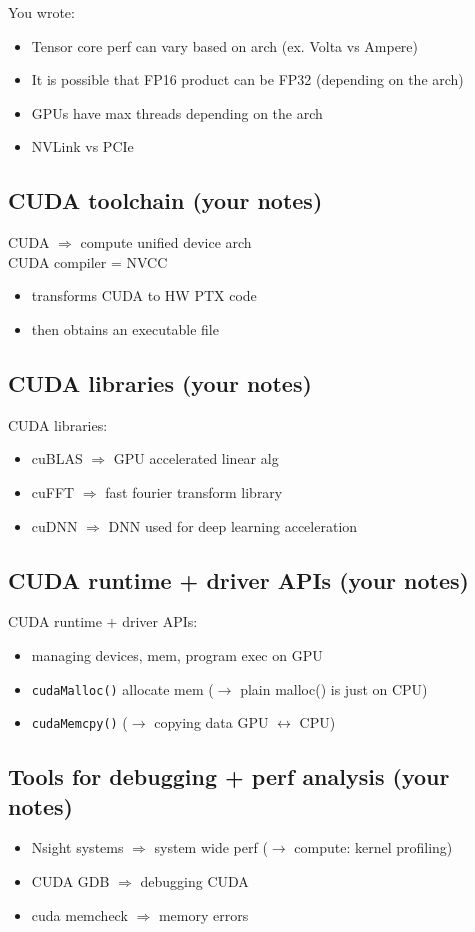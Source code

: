 \documentclass[11pt]{article}
\newcommand{\blue}[1]{\textcolor{myblue}{#1}}
\begin{document}
You wrote:
\begin{itemize}
\item Tensor core perf can vary based on arch (ex. Volta vs Ampere)
\item It is possible that FP16 product can be FP32 (depending on the arch)
\item GPUs have max threads depending on the arch
\item NVLink vs PCIe
\end{itemize}

\subsection*{\blue{CUDA toolchain (your notes)}}
CUDA $\Rightarrow$ compute unified device arch\\
CUDA compiler = NVCC
\begin{itemize}
\item transforms CUDA to HW PTX code
\item then obtains an executable file
\end{itemize}

\subsection*{\blue{CUDA libraries (your notes)}}
CUDA libraries:
\begin{itemize}
\item cuBLAS $\Rightarrow$ GPU accelerated linear alg
\item cuFFT $\Rightarrow$ fast fourier transform library
\item cuDNN $\Rightarrow$ DNN used for deep learning acceleration
\end{itemize}

\subsection*{\blue{CUDA runtime + driver APIs (your notes)}}
CUDA runtime + driver APIs:
\begin{itemize}
\item managing devices, mem, program exec on GPU
\item \texttt{cudaMalloc()} allocate mem \quad ($\rightarrow$ plain malloc() is just on CPU)
\item \texttt{cudaMemcpy()} \quad ($\rightarrow$ copying data GPU $\leftrightarrow$ CPU)
\end{itemize}

\subsection*{\blue{Tools for debugging + perf analysis (your notes)}}
\begin{itemize}
\item Nsight systems $\Rightarrow$ system wide perf \quad ($\rightarrow$ compute: kernel profiling)
\item CUDA GDB $\Rightarrow$ debugging CUDA
\item cuda memcheck $\Rightarrow$ memory errors
\end{itemize}
\end{document}
